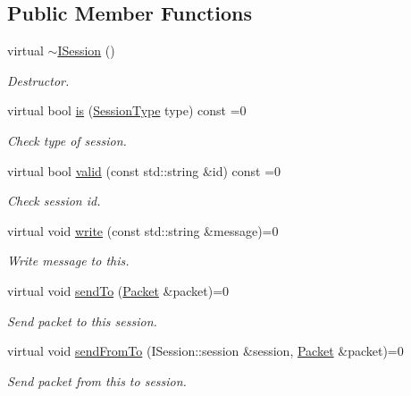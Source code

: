 \subsection*{Public Member Functions}
\begin{DoxyCompactItemize}
\item 
\hypertarget{class_i_session_a5b982ad29eaaff7ef275522bbd3be999}{virtual \hyperlink{class_i_session_a5b982ad29eaaff7ef275522bbd3be999}{$\sim$\-I\-Session} ()}\label{class_i_session_a5b982ad29eaaff7ef275522bbd3be999}

\begin{DoxyCompactList}\small\item\em Destructor. \end{DoxyCompactList}\item 
virtual bool \hyperlink{class_i_session_a45929a4acdd831f243b73fb1be825410}{is} (\hyperlink{class_i_session_a7989a93d03d8345d213a021d7444a32f}{Session\-Type} type) const =0
\begin{DoxyCompactList}\small\item\em Check type of session. \end{DoxyCompactList}\item 
virtual bool \hyperlink{class_i_session_aa58f6d0ce4e8faac6a416d78b83765ff}{valid} (const std\-::string \&id) const =0
\begin{DoxyCompactList}\small\item\em Check session id. \end{DoxyCompactList}\item 
virtual void \hyperlink{class_i_session_acbf362464fcfb9210001ebc85a074401}{write} (const std\-::string \&message)=0
\begin{DoxyCompactList}\small\item\em Write message to this. \end{DoxyCompactList}\item 
virtual void \hyperlink{class_i_session_a229146f239f1af10a531f869c730f8f6}{send\-To} (\hyperlink{class_packet}{Packet} \&packet)=0
\begin{DoxyCompactList}\small\item\em Send packet to this session. \end{DoxyCompactList}\item 
virtual void \hyperlink{class_i_session_adf3b8c5fcf9891b3ffcc5846da568a71}{send\-From\-To} (I\-Session\-::session \&session, \hyperlink{class_packet}{Packet} \&packet)=0
\begin{DoxyCompactList}\small\item\em Send packet from this to session. \end{DoxyCompactList}\item 

\end{DoxyCompactItemize}
